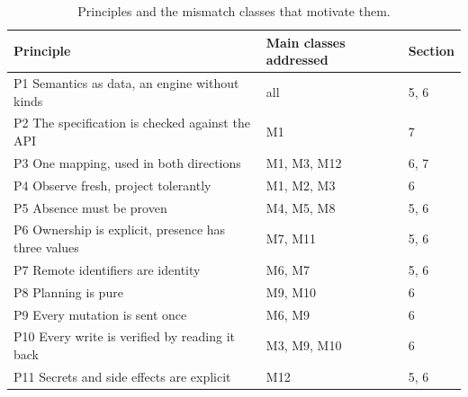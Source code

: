 \begin{table}[tbp]
\centering
\small
\caption{Principles and the mismatch classes that motivate them.}
\label{tab:4}
\begin{tabularx}{\linewidth}{Lll}
\toprule
Principle & Main classes addressed & Section \\
\midrule
P1 Semantics as data, an engine without kinds & all & 5, 6 \\
P2 The specification is checked against the API & M1 & 7 \\
P3 One mapping, used in both directions & M1, M3, M12 & 6, 7 \\
P4 Observe fresh, project tolerantly & M1, M2, M3 & 6 \\
P5 Absence must be proven & M4, M5, M8 & 5, 6 \\
P6 Ownership is explicit, presence has three values & M7, M11 & 5, 6 \\
P7 Remote identifiers are identity & M6, M7 & 5, 6 \\
P8 Planning is pure & M9, M10 & 6 \\
P9 Every mutation is sent once & M6, M9 & 6 \\
P10 Every write is verified by reading it back & M3, M9, M10 & 6 \\
P11 Secrets and side effects are explicit & M12 & 5, 6 \\
\bottomrule
\end{tabularx}
\end{table}
